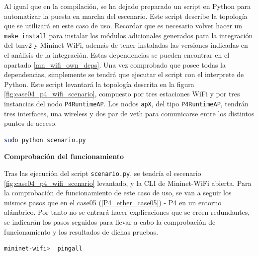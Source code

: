 Al igual que en la compilación, se ha dejado preparado un script en Python para automatizar la puesta en marcha del escenario. Este script describe la topología que se utilizará en este caso de uso. Recordar que es necesario volver hacer un \texttt{make install} para instalar los módulos adicionales generados para la integración del \gls{bmv2} y Mininet-WiFi, además de tener instaladas las versiones indicadas en el análisis de la integración. Estas dependencias se pueden encontrar en el apartado \ref{mn_wifi_own_deps}. Una vez comprobado que posee todas la dependencias, simplemente se tendrá que ejecutar el script con el interprete de Python. Este script levantará la topología descrita en la figura \ref{fig:case04_p4_wifi_scenario}, compuesto por tres estaciones WiFi y por tres instancias del nodo \texttt{P4RuntimeAP}. Los nodos \texttt{apX}, del tipo \texttt{P4RuntimeAP}, tendrán tres interfaces, una wireless y dos par de \gls{veth} para comunicarse entre los distintos puntos de acceso.


\begin{lstlisting}[language= bash, style=Consola, caption={Puesta en marcha del escenario  - Case04},label=code:case04_p4_wifi_run]
    sudo python scenario.py
\end{lstlisting}


\vspace{0.5cm}
\textbf{Comprobación del funcionamiento}\\
\par


Tras las ejecución del script \texttt{scenario.py}, se tendría el escenario \ref{fig:case04_p4_wifi_scenario} levantado, y la CLI de Mininet-WiFi abierta. Para la comprobación de funcionamiento de este caso de uso, se van a seguir los mismos pasos que en el case05 (\ref{P4_ether_case05}) - P4 en un entorno alámbrico. Por tanto no se entrará hacer explicaciones que se creen redundantes, se indicarán los pasos seguidos para llevar a cabo la comprobación de funcionamiento y los resultados de dichas pruebas. 

\begin{lstlisting}[language= bash, style=Consola, caption={Pasos a seguir para comprobar el funcionamiento - Case04},label=code:case04_p4_wifi_func1]
    mininet-wifi>  pingall
\end{lstlisting}
\vspace{0.5cm}


